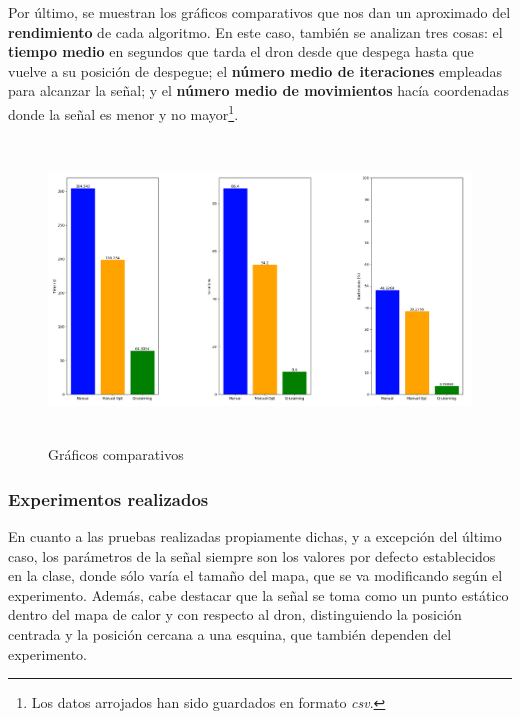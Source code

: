 Por último, se muestran los gráficos comparativos que nos dan un aproximado del \textbf{rendimiento} de cada algoritmo. En este caso, también se analizan tres cosas: el \textbf{tiempo medio} en segundos que tarda el dron desde que despega hasta que vuelve a su posición de despegue; el \textbf{número medio de iteraciones} empleadas para alcanzar la señal; y el \textbf{número medio de movimientos} hacía coordenadas donde la señal es menor y no mayor\footnote[4]{Los datos arrojados han sido guardados en formato \emph{csv}.}.\\

\begin{figure} [H]
    \begin{center}
    \includegraphics[height=8cm]{imagenes/cap4/15_avg_graphs.png}
    \end{center}
    \caption[Gráficos comparativos]{Gráficos comparativos}
    \label{fig:compare_graph}
\end{figure}

\subsubsection{Experimentos realizados}
\label{subsubsec:experimentos}

En cuanto a las pruebas realizadas propiamente dichas, y a excepción del último caso, los parámetros de la señal siempre son los valores por defecto establecidos en la clase, donde sólo varía el tamaño del mapa, que se va modificando según el experimento. Además, cabe destacar que la señal se toma como un punto estático dentro del mapa de calor y con respecto al dron, distinguiendo la posición centrada y la posición cercana a una esquina, que también dependen del experimento.\\

